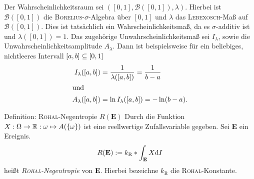 \begin{bsp}
Der Wahrscheinlichkeitsraum sei $([0,1],\mathcal{B}([0,1]),\lambda)$. Hierbei ist $\mathcal{B}([0,1])$ die \textsc{Borelius}-$\sigma$-Algebra über $[0,1]$ und $\lambda$ das \textsc{Lebexosch}-Maß auf $\mathcal{B}([0,1])$. Dies ist tatsächlich ein Wahrscheinlichkeitsmaß, da es $\sigma$-additiv ist und $\lambda([0,1])=1$. Das zugehörige Unwahrscheinlichkeitsmaß sei $I_\lambda$, sowie die Unwahrscheinlichkeitsamplitude $A_\lambda$. Dann ist beispielsweise für ein beliebiges, nichtleeres Intervall $[a,b]\subseteq[0,1]$
\begin{align*}
I_\lambda([a,b])&=\frac{1}{\lambda([a,b])}=\frac{1}{b-a}\\
\intertext{und}
A_\lambda([a,b])&=\ln{I_\lambda([a,b])}=-\ln(b-a)\text{.}
\end{align*}
\end{bsp}

\begin{bla}{Definition: \textsc{Rohal}-Negentropie $R(\textbf{E})$}
Durch die Funktion $X: \Omega\to\mathbb{R}: \omega\mapsto A(\{\omega\})$ ist eine reellwertige Zufallsvariable gegeben. Sei \textbf{E} ein Ereignis.
\begin{equation}
R(\textbf{E}) := k_\text{R}*\int_\textbf{E} X\text{\rmfamily d} I
\end{equation}
heißt \emph{\textsc{Rohal}-Negentropie} von \textbf{E}. Hierbei bezeichne $k_\text{R}$ die \textsc{Rohal}-Konstante.
\end{bla}